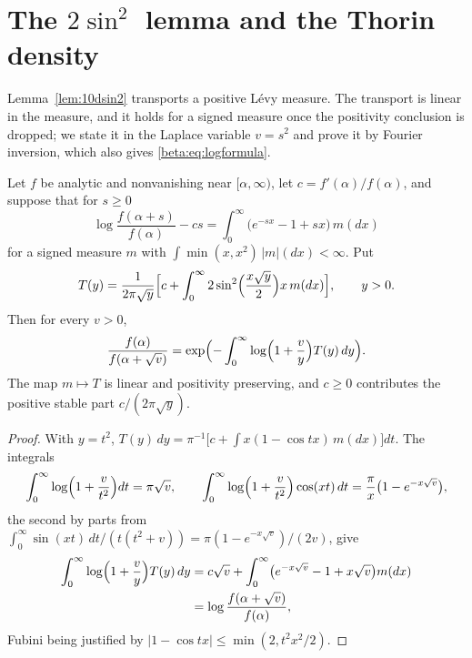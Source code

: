 \section{The \texorpdfstring{$2\sin^2$}{2 sin squared} lemma and the Thorin density}\label{beta:sec:lemma}

Lemma~\ref{lem:10dsin2} transports a positive L\'evy measure. The transport is linear in the measure, and it holds for a signed measure once the positivity conclusion is dropped; we state it in the Laplace variable $v=s^2$ and prove it by Fourier inversion, which also gives \eqref{beta:eq:logformula}.

\begin{lemma}\label{beta:lem:2sin2}
Let $f$ be analytic and nonvanishing near $[\alpha,\infty)$, let $c=f'(\alpha)/f(\alpha)$, and suppose that for $s\ge0$
\[
\log\frac{f(\alpha+s)}{f(\alpha)}-cs=\int_0^\infty\bigl(e^{-sx}-1+sx\bigr)\,m(dx)
\]
for a signed measure $m$ with $\int\min(x,x^2)\,|m|(dx)<\infty$. Put
\begin{equation}\label{beta:eq:Tdef}
T(y)=\frac{1}{2\pi\sqrt y}\Bigl[c+\int_0^\infty2\sin^2\Bigl(\frac{x\sqrt y}{2}\Bigr)x\,m(dx)\Bigr],\qquad y>0.
\end{equation}
Then for every $v>0$,
\begin{equation}\label{beta:eq:thorinrep}
\frac{f(\alpha)}{f(\alpha+\sqrt v)}=\exp\Bigl(-\int_0^\infty\log\Bigl(1+\frac vy\Bigr)T(y)\,dy\Bigr).
\end{equation}
The map $m\mapsto T$ is linear and positivity preserving, and $c\ge0$ contributes the positive stable part $c/(2\pi\sqrt y)$.
\end{lemma}

\begin{proof}
With $y=t^2$, $T(y)\,dy=\pi^{-1}\bigl[c+\int x(1-\cos tx)\,m(dx)\bigr]dt$. The integrals
\[
\int_0^\infty\log\Bigl(1+\frac{v}{t^2}\Bigr)dt=\pi\sqrt v,\qquad
\int_0^\infty\log\Bigl(1+\frac{v}{t^2}\Bigr)\cos(xt)\,dt=\frac{\pi}{x}\bigl(1-e^{-x\sqrt v}\bigr),
\]
the second by parts from $\int_0^\infty\sin(xt)\,dt/(t(t^2+v))=\pi(1-e^{-x\sqrt v})/(2v)$, give
\begin{align*}
\int_0^\infty\log\Bigl(1+\frac vy\Bigr)T(y)\,dy
&=c\sqrt v+\int_0^\infty\bigl(e^{-x\sqrt v}-1+x\sqrt v\bigr)m(dx)\\
&=\log\frac{f(\alpha+\sqrt v)}{f(\alpha)} ,
\end{align*}
Fubini being justified by $|1-\cos tx|\le\min(2,t^2x^2/2)$.
\end{proof}

